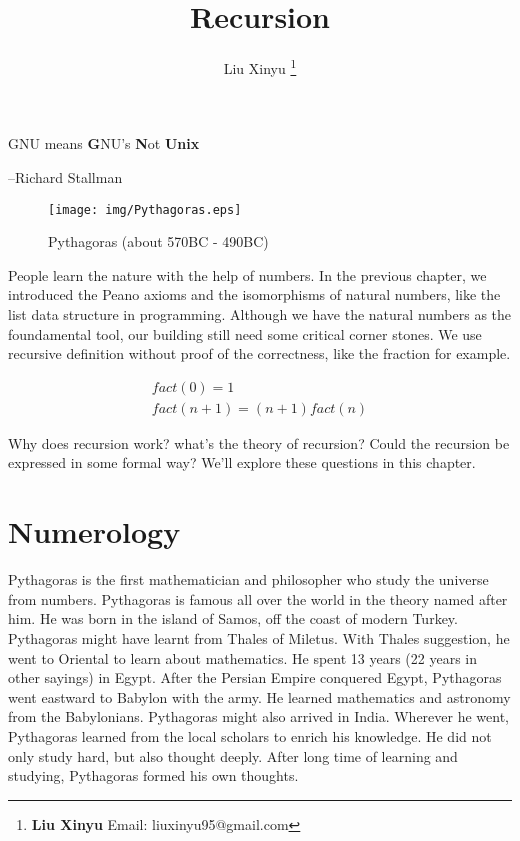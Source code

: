 \documentclass{article}
\begin{document}
\title{Recursion}

\author{Liu Xinyu
\thanks{{\bfseries Liu Xinyu} \newline
  Email: liuxinyu95@gmail.com}}

\maketitle
\fi


\epigraph{GNU means \textbf{G}NU's \textbf{N}ot \textbf{Unix}}{--Richard Stallman}

\begin{wrapfigure}{R}{0.3\textwidth}
 \centering
 \texttt{[image: img/Pythagoras.eps]}
 \captionsetup{labelformat=empty}
 \caption{Pythagoras (about 570BC - 490BC)}
 \label{fig:Pythagoras}
\end{wrapfigure}

People learn the nature with the help of numbers. In the previous chapter, we introduced the Peano axioms and the isomorphisms of natural numbers, like the list data structure in programming. Although we have the natural numbers as the foundamental tool, our building still need some critical corner stones. We use recursive definition without proof of the correctness, like the fraction for example.

\[
\begin{array}{l}
fact(0) = 1 \\
fact(n + 1) = (n + 1) fact(n)
\end{array}
\]

Why does recursion work? what's the theory of recursion? Could the recursion be expressed in some formal way? We'll explore these questions in this chapter.

\section{Numerology}

Pythagoras is the first mathematician and philosopher who study the universe from numbers. Pythagoras is famous all over the world in the theory named after him. He was born in the island of Samos, off the coast of modern Turkey. Pythagoras might have learnt from Thales of Miletus. With Thales suggestion, he went to Oriental to learn about mathematics. He spent 13 years (22 years in other sayings) in Egypt. After the Persian Empire conquered Egypt, Pythagoras went eastward to Babylon with the army. He learned mathematics and astronomy from the Babylonians. Pythagoras might also arrived in India. Wherever he went, Pythagoras learned from the local scholars to enrich his knowledge. He did not only study hard, but also thought deeply. After long time of learning and studying, Pythagoras formed his own thoughts\cite{HanXueTao16}.
\end{document}

